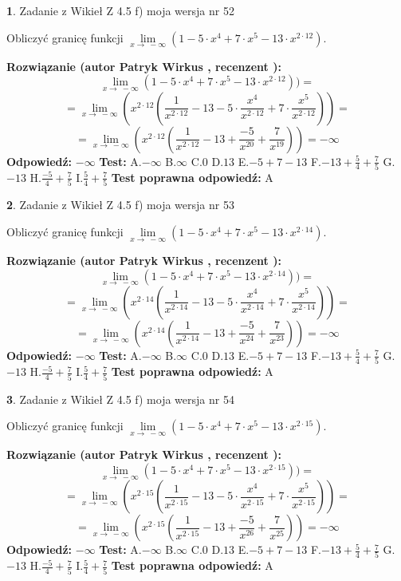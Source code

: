 \documentclass[12pt, a4paper]{article}
\theoremstyle{definition} %
\newtheorem{zad}{}
\newcommand{\zadStart}[1]{\begin{zad}#1\newline}
\newcommand{\zadStop}{\end{zad}}
\newcommand{\rozwStart}[2]{\noindent \textbf{Rozwiązanie (autor #1 , recenzent #2): }\newline}
\newcommand{\rozwStop}{\newline}
\newcommand{\odpStart}{\noindent \textbf{Odpowiedź:}\newline}
\newcommand{\odpStop}{\newline}
\newcommand{\testStart}{\noindent \textbf{Test:}\newline}
\newcommand{\testStop}{\newline}
\newcommand{\kluczStart}{\noindent \textbf{Test poprawna odpowiedź:}\newline}
\newcommand{\kluczStop}{\newline}
\begin{document}
\zadStart{Zadanie z Wikieł Z 4.5 f) moja wersja nr 52}



Obliczyć granicę funkcji  $\lim\limits_{x\to\ -\infty}(1 - 5 \cdot x^{4}+7 \cdot x^{5}- 13 \cdot x^{2\cdot12})$.
\zadStop
\rozwStart{Patryk Wirkus}{}
$$\lim\limits_{x\to\ -\infty}(1 - 5 \cdot x^{4}+7 \cdot x^{5}- 13 \cdot x^{2\cdot12}))=$$
$$=\lim\limits_{x\to\ -\infty}(x^{2\cdot12}(\frac{1}{x^{2\cdot12}}-13 -5 \cdot \frac{x^{4}}{x^{2\cdot12}}+7 \cdot \frac{x^{5}}{x^{2\cdot12}}))=$$
$$=\lim\limits_{x\to\ -\infty}(x^{2\cdot12}(\frac{1}{x^{2\cdot12}}-13 + \frac{-5}{x^{20}}+ \frac{7}{x^{19}}))=-\infty$$
\rozwStop
\odpStart
$-\infty$
\odpStop
\testStart
A.$-\infty$ B.$\infty$ C.$0$ D.$13$ E.$-5 + 7 - 13$
F.$-13+\frac{5}{4}+\frac{7}{5}$ G.$-13$
H.$\frac{-5}{4}+\frac{7}{5}$
I.$\frac{5}{4}+\frac{7}{5}$
\testStop
\kluczStart
A
\kluczStop



\zadStart{Zadanie z Wikieł Z 4.5 f) moja wersja nr 53}



Obliczyć granicę funkcji  $\lim\limits_{x\to\ -\infty}(1 - 5 \cdot x^{4}+7 \cdot x^{5}- 13 \cdot x^{2\cdot14})$.
\zadStop
\rozwStart{Patryk Wirkus}{}
$$\lim\limits_{x\to\ -\infty}(1 - 5 \cdot x^{4}+7 \cdot x^{5}- 13 \cdot x^{2\cdot14}))=$$
$$=\lim\limits_{x\to\ -\infty}(x^{2\cdot14}(\frac{1}{x^{2\cdot14}}-13 -5 \cdot \frac{x^{4}}{x^{2\cdot14}}+7 \cdot \frac{x^{5}}{x^{2\cdot14}}))=$$
$$=\lim\limits_{x\to\ -\infty}(x^{2\cdot14}(\frac{1}{x^{2\cdot14}}-13 + \frac{-5}{x^{24}}+ \frac{7}{x^{23}}))=-\infty$$
\rozwStop
\odpStart
$-\infty$
\odpStop
\testStart
A.$-\infty$ B.$\infty$ C.$0$ D.$13$ E.$-5 + 7 - 13$
F.$-13+\frac{5}{4}+\frac{7}{5}$ G.$-13$
H.$\frac{-5}{4}+\frac{7}{5}$
I.$\frac{5}{4}+\frac{7}{5}$
\testStop
\kluczStart
A
\kluczStop



\zadStart{Zadanie z Wikieł Z 4.5 f) moja wersja nr 54}



Obliczyć granicę funkcji  $\lim\limits_{x\to\ -\infty}(1 - 5 \cdot x^{4}+7 \cdot x^{5}- 13 \cdot x^{2\cdot15})$.
\zadStop
\rozwStart{Patryk Wirkus}{}
$$\lim\limits_{x\to\ -\infty}(1 - 5 \cdot x^{4}+7 \cdot x^{5}- 13 \cdot x^{2\cdot15}))=$$
$$=\lim\limits_{x\to\ -\infty}(x^{2\cdot15}(\frac{1}{x^{2\cdot15}}-13 -5 \cdot \frac{x^{4}}{x^{2\cdot15}}+7 \cdot \frac{x^{5}}{x^{2\cdot15}}))=$$
$$=\lim\limits_{x\to\ -\infty}(x^{2\cdot15}(\frac{1}{x^{2\cdot15}}-13 + \frac{-5}{x^{26}}+ \frac{7}{x^{25}}))=-\infty$$
\rozwStop
\odpStart
$-\infty$
\odpStop
\testStart
A.$-\infty$ B.$\infty$ C.$0$ D.$13$ E.$-5 + 7 - 13$
F.$-13+\frac{5}{4}+\frac{7}{5}$ G.$-13$
H.$\frac{-5}{4}+\frac{7}{5}$
I.$\frac{5}{4}+\frac{7}{5}$
\testStop
\kluczStart
A
\kluczStop
\end{document}
